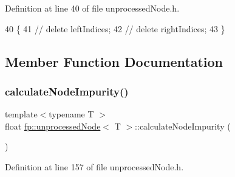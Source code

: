 Definition at line 40 of file unprocessed\+Node.\+h.


\begin{DoxyCode}
40                                   \{
41             \textcolor{comment}{//  delete leftIndices;}
42             \textcolor{comment}{//  delete rightIndices;}
43                 \}
\end{DoxyCode}


\subsection{Member Function Documentation}
\mbox{\label{classfp_1_1unprocessedNode_a0278b4dd8d905d38d75ced9a95839a12}} 
\subsubsection{\texorpdfstring{calculate\+Node\+Impurity()}{calculateNodeImpurity()}}
{\footnotesize\ttfamily template$<$typename T $>$ \\
float \hyperlink{classfp_1_1unprocessedNode}{fp\+::unprocessed\+Node}$<$ T $>$\+::calculate\+Node\+Impurity (\begin{DoxyParamCaption}{ }\end{DoxyParamCaption})\hspace{0.3cm}{\ttfamily [inline]}}



Definition at line 157 of file unprocessed\+Node.\+h.



